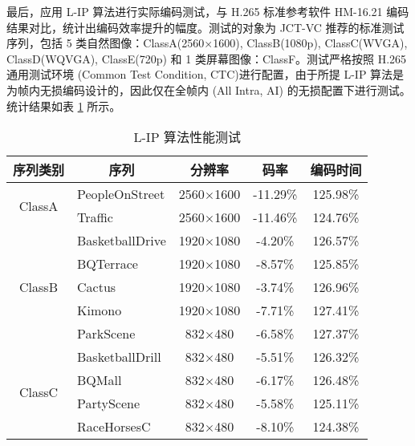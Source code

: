 最后，应用 L-IP 算法进行实际编码测试，与 H.265 标准参考软件 HM-16.21 编码结果对比，统计出编码效率提升的幅度。测试的对象为 JCT-VC 推荐的标准测试序列，包括 5 类自然图像：ClassA(2560$\times$1600), ClassB(1080p), ClassC(WVGA), ClassD(WQVGA), ClassE(720p) 和 1 类屏幕图像：ClassF。测试严格按照 H.265 通用测试环境 (Common Test Condition, CTC)进行配置，由于所提 L-IP 算法是为帧内无损编码设计的，因此仅在全帧内 (All Intra, AI) 的无损配置下进行测试。统计结果如表 \ref{tab:L-IPSummary} 所示。
\begin{table}[htb]
    \centering
    \caption{L-IP 算法性能测试}
    \label{tab:L-IPSummary}
    \begin{tabular}{@{}clccc@{}}
        \toprule
        序列类别                               & \multicolumn{1}{c}{序列}     & 分辨率           & 码率     & 编码时间 \\ \midrule
        \multirow{2}{*}{ClassA}                & PeopleOnStreet               & 2560$\times$1600 & -11.29\% & 125.98\% \\
                                               & Traffic                      & 2560$\times$1600 & -11.46\% & 124.76\% \\
        \multirow{5}{*}{ClassB}                & BasketballDrive              & 1920$\times$1080 & -4.20\%  & 126.57\% \\
                                               & BQTerrace                    & 1920$\times$1080 & -8.57\%  & 125.85\% \\
                                               & Cactus                       & 1920$\times$1080 & -3.74\%  & 126.96\% \\
                                               & Kimono                       & 1920$\times$1080 & -7.71\%  & 127.41\% \\
                                               & ParkScene                    & 832$\times$480   & -6.58\%  & 127.37\% \\
        \multirow{4}{*}{ClassC}                & BasketballDrill              & 832$\times$480   & -5.51\%  & 126.32\% \\
                                               & BQMall                       & 832$\times$480   & -6.17\%  & 126.48\% \\
                                               & PartyScene                   & 832$\times$480   & -5.58\%  & 125.11\% \\
                                               & RaceHorsesC                  & 832$\times$480   & -8.10\%  & 124.38\% \\

\end{tabular}
\end{table}
